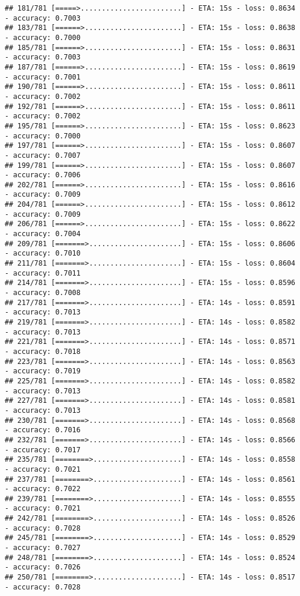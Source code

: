 \documentclass[
]{article}
\begin{document}
\begin{verbatim}
## 181/781 [=====>........................] - ETA: 15s - loss: 0.8634 - accuracy: 0.7003
## 183/781 [======>.......................] - ETA: 15s - loss: 0.8638 - accuracy: 0.7000
## 185/781 [======>.......................] - ETA: 15s - loss: 0.8631 - accuracy: 0.7003
## 187/781 [======>.......................] - ETA: 15s - loss: 0.8619 - accuracy: 0.7001
## 190/781 [======>.......................] - ETA: 15s - loss: 0.8611 - accuracy: 0.7002
## 192/781 [======>.......................] - ETA: 15s - loss: 0.8611 - accuracy: 0.7002
## 195/781 [======>.......................] - ETA: 15s - loss: 0.8623 - accuracy: 0.7000
## 197/781 [======>.......................] - ETA: 15s - loss: 0.8607 - accuracy: 0.7007
## 199/781 [======>.......................] - ETA: 15s - loss: 0.8607 - accuracy: 0.7006
## 202/781 [======>.......................] - ETA: 15s - loss: 0.8616 - accuracy: 0.7009
## 204/781 [======>.......................] - ETA: 15s - loss: 0.8612 - accuracy: 0.7009
## 206/781 [======>.......................] - ETA: 15s - loss: 0.8622 - accuracy: 0.7004
## 209/781 [=======>......................] - ETA: 15s - loss: 0.8606 - accuracy: 0.7010
## 211/781 [=======>......................] - ETA: 15s - loss: 0.8604 - accuracy: 0.7011
## 214/781 [=======>......................] - ETA: 15s - loss: 0.8596 - accuracy: 0.7008
## 217/781 [=======>......................] - ETA: 14s - loss: 0.8591 - accuracy: 0.7013
## 219/781 [=======>......................] - ETA: 14s - loss: 0.8582 - accuracy: 0.7013
## 221/781 [=======>......................] - ETA: 14s - loss: 0.8571 - accuracy: 0.7018
## 223/781 [=======>......................] - ETA: 14s - loss: 0.8563 - accuracy: 0.7019
## 225/781 [=======>......................] - ETA: 14s - loss: 0.8582 - accuracy: 0.7013
## 227/781 [=======>......................] - ETA: 14s - loss: 0.8581 - accuracy: 0.7013
## 230/781 [=======>......................] - ETA: 14s - loss: 0.8568 - accuracy: 0.7016
## 232/781 [=======>......................] - ETA: 14s - loss: 0.8566 - accuracy: 0.7017
## 235/781 [========>.....................] - ETA: 14s - loss: 0.8558 - accuracy: 0.7021
## 237/781 [========>.....................] - ETA: 14s - loss: 0.8561 - accuracy: 0.7022
## 239/781 [========>.....................] - ETA: 14s - loss: 0.8555 - accuracy: 0.7021
## 242/781 [========>.....................] - ETA: 14s - loss: 0.8526 - accuracy: 0.7028
## 245/781 [========>.....................] - ETA: 14s - loss: 0.8529 - accuracy: 0.7027
## 248/781 [========>.....................] - ETA: 14s - loss: 0.8524 - accuracy: 0.7026
## 250/781 [========>.....................] - ETA: 14s - loss: 0.8517 - accuracy: 0.7028

\end{verbatim}
\end{document}
